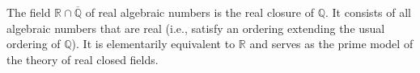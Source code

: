 The field $\mathbb{R} \cap \overline{\mathbb{Q}}$ of real algebraic numbers is the real closure of $\mathbb{Q}$. It consists of all algebraic numbers that are real (i.e., satisfy an ordering extending the usual ordering of $\mathbb{Q}$). It is elementarily equivalent to $\mathbb{R}$ and serves as the prime model of the theory of real closed fields.
